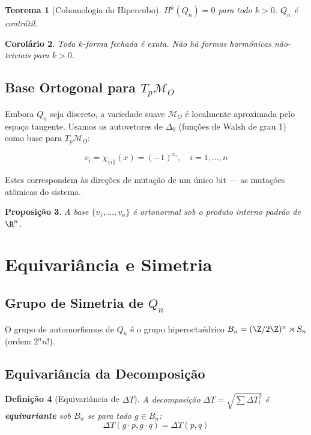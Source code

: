 \documentclass[11pt,a4paper]{article}
\newtheorem{theorem}{Teorema}[section]
\newtheorem{proposition}[theorem]{Proposição}
\newtheorem{definition}[theorem]{Definição}
\newtheorem{corollary}[theorem]{Corolário}
\newcommand{\DeltaT}{\Delta T}
\newcommand{\MT}{\mathcal{M}_O}
\newcommand{\laplacian}{\Delta}
\begin{document}
\begin{theorem}[Cohomologia do Hipercubo]
$H^k(Q_n) = 0$ para todo $k > 0$. $Q_n$ é contrátil.
\end{theorem}

\begin{corollary}
Toda $k$-forma fechada é exata. Não há formas harmônicas não-triviais para $k > 0$.
\end{corollary}

\subsection{Base Ortogonal para $T_p\MT$}

Embora $Q_n$ seja discreto, a variedade suave $\MT$ é localmente aproximada pelo espaço tangente. Usamos os autovetores de $\laplacian_0$ (funções de Walsh de grau 1) como base para $T_p\MT$:

\begin{equation}
    v_i = \chi_{\{i\}}(x) = (-1)^{x_i}, \quad i = 1, \dots, n
\end{equation}

Estes correspondem às direções de mutação de um único bit — as mutações atômicas do sistema.

\begin{proposition}
A base $\{v_1, \dots, v_n\}$ é ortonormal sob o produto interno padrão de $\R^n$.
\end{proposition}

\section{Equivariância e Simetria}

\subsection{Grupo de Simetria de $Q_n$}

O grupo de automorfismos de $Q_n$ é o grupo hiperoctaédrico $B_n = (\Z/2\Z)^n \rtimes S_n$ (ordem $2^n n!$).

\subsection{Equivariância da Decomposição}

\begin{definition}[Equivariância de $\DeltaT$]
A decomposição $\DeltaT = \sqrt{\sum \DeltaT_i^2}$ é \textbf{equivariante} sob $B_n$ se para todo $g \in B_n$:
\begin{equation}
    \DeltaT(g \cdot p, g \cdot q) = \DeltaT(p, q)
\end{equation}
\end{definition}
\end{document}
